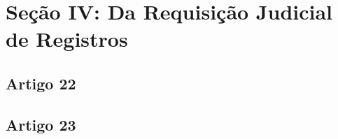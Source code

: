 \section{Seção IV: Da Requisição Judicial de Registros}

\subsection{Artigo 22}


\subsection{Artigo 23}

